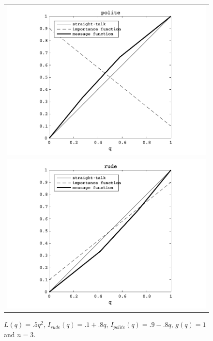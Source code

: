 \documentclass[12pt]{article}
\begin{document}
\begin{figure}[H]
\centering
\begin{tabular}{c}
\includegraphics{polite3v1} \\ 
\includegraphics{rude3v1}
\end{tabular}
\caption{$L(q)=.5q^2$, $I_{rude}(q)=.1+.8q$, $I_{polite}(q)=.9-.8q$, $g(q)=1$ and $n=3$.}
\end{figure}
\end{document}
